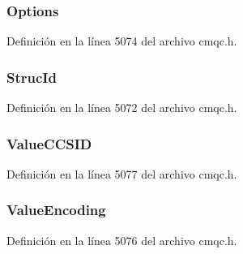 \subsubsection[{Options}]{ Options}\label{structtag_m_q_s_m_p_o_ad7aff2d6c6044809464380998d24ec5c}


Definición en la línea 5074 del archivo cmqc.\+h.

\hypertarget{structtag_m_q_s_m_p_o_a0530922ca944569b52601d74941f96e4}{}
\subsubsection[{Struc\+Id}]{ Struc\+Id}\label{structtag_m_q_s_m_p_o_a0530922ca944569b52601d74941f96e4}


Definición en la línea 5072 del archivo cmqc.\+h.

\hypertarget{structtag_m_q_s_m_p_o_ac5d324f94c6c72d6e38cb236af37da93}{}
\subsubsection[{Value\+C\+C\+S\+I\+D}]{ Value\+C\+C\+S\+I\+D}\label{structtag_m_q_s_m_p_o_ac5d324f94c6c72d6e38cb236af37da93}


Definición en la línea 5077 del archivo cmqc.\+h.

\hypertarget{structtag_m_q_s_m_p_o_a490df67c11df1c06a7a55933584e844a}{}
\subsubsection[{Value\+Encoding}]{ Value\+Encoding}\label{structtag_m_q_s_m_p_o_a490df67c11df1c06a7a55933584e844a}


Definición en la línea 5076 del archivo cmqc.\+h.

\hypertarget{structtag_m_q_s_m_p_o_a0656ef8f766b3907d394d88a35d7b7e9}{}
